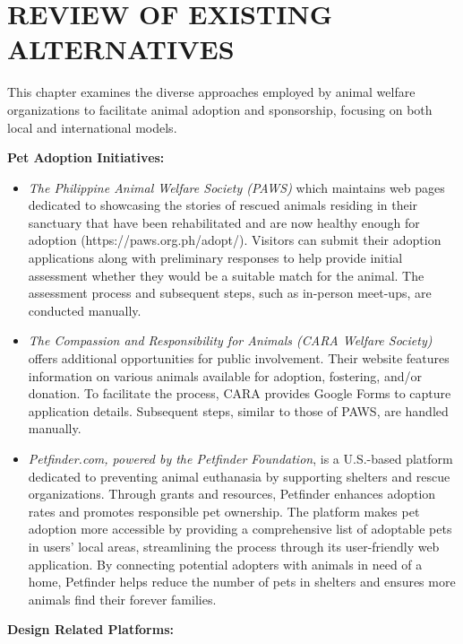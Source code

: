 \section{REVIEW OF EXISTING ALTERNATIVES}
This chapter examines the diverse approaches employed by animal welfare organizations to facilitate animal adoption and sponsorship, focusing on both local and international models. 


\textbf{Pet Adoption Initiatives:}

\begin{itemize}
 \item \textit{The Philippine Animal Welfare Society (PAWS)} which maintains web pages dedicated to showcasing the stories of rescued animals residing in their sanctuary that have been rehabilitated and are now healthy enough for adoption (https://paws.org.ph/adopt/). Visitors can submit their adoption applications along with preliminary responses to help provide initial assessment whether they would be a suitable match for the animal. The assessment process and subsequent steps, such as in-person meet-ups, are conducted manually.

  \item \textit{The Compassion and Responsibility for Animals (CARA Welfare Society)} offers additional opportunities for public involvement. Their website features information on various animals available for adoption, fostering, and/or donation. To facilitate the process, CARA provides Google Forms to capture application details. Subsequent steps, similar to those of PAWS, are handled manually.

  \item \textit{Petfinder.com, powered by the Petfinder Foundation}, is a U.S.-based platform dedicated to preventing animal euthanasia by supporting shelters and rescue organizations. Through grants and resources, Petfinder enhances adoption rates and promotes responsible pet ownership. The platform makes pet adoption more accessible by providing a comprehensive list of adoptable pets in users' local areas, streamlining the process through its user-friendly web application. By connecting potential adopters with animals in need of a home, Petfinder helps reduce the number of pets in shelters and ensures more animals find their forever families.
 \end{itemize}

\newpage
\textbf{Design Related Platforms:}

